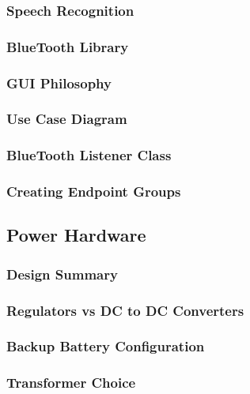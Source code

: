 \subsubsection{Speech Recognition}

\subsubsection{BlueTooth Library}

\subsubsection{GUI Philosophy}

\subsubsection{Use Case Diagram}

\subsubsection{BlueTooth Listener Class}

\subsubsection{Creating Endpoint Groups}

\subsection{Power Hardware}

\subsubsection{Design Summary}

\subsubsection{Regulators vs DC to DC Converters}

\subsubsection{Backup Battery Configuration}

\subsubsection{Transformer Choice}

